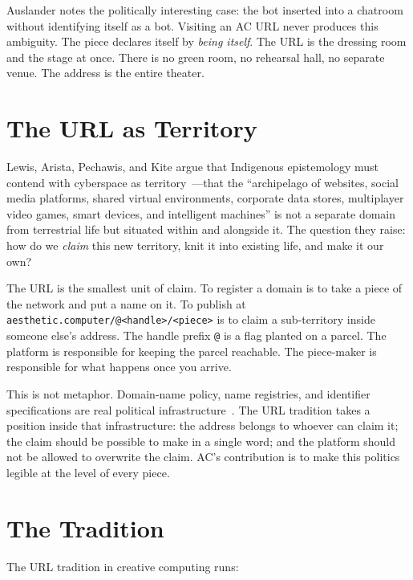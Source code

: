 \documentclass[10pt,letterpaper,twocolumn]{article}
\newcommand{\code}[1]{\texttt{#1}}
\begin{document}
Auslander notes the politically interesting case: the bot inserted into a chatroom without identifying itself as a bot. Visiting an AC URL never produces this ambiguity. The piece declares itself by \emph{being itself}. The URL is the dressing room and the stage at once. There is no green room, no rehearsal hall, no separate venue. The address is the entire theater.

\section{The URL as Territory}

Lewis, Arista, Pechawis, and Kite argue that Indigenous epistemology must contend with cyberspace as territory~\citep{lewis2018kin}---that the ``archipelago of websites, social media platforms, shared virtual environments, corporate data stores, multiplayer video games, smart devices, and intelligent machines'' is not a separate domain from terrestrial life but situated within and alongside it. The question they raise: how do we \emph{claim} this new territory, knit it into existing life, and make it our own?

The URL is the smallest unit of claim. To register a domain is to take a piece of the network and put a name on it. To publish at \code{aesthetic.computer/@<handle>/<piece>} is to claim a sub-territory inside someone else's address. The handle prefix \code{@} is a flag planted on a parcel. The platform is responsible for keeping the parcel reachable. The piece-maker is responsible for what happens once you arrive.

This is not metaphor. Domain-name policy, name registries, and identifier specifications are real political infrastructure~\citep{galloway2004protocol}. The URL tradition takes a position inside that infrastructure: the address belongs to whoever can claim it; the claim should be possible to make in a single word; and the platform should not be allowed to overwrite the claim. AC's contribution is to make this politics legible at the level of every piece.

\section{The Tradition}

The URL tradition in creative computing runs:
\end{document}
